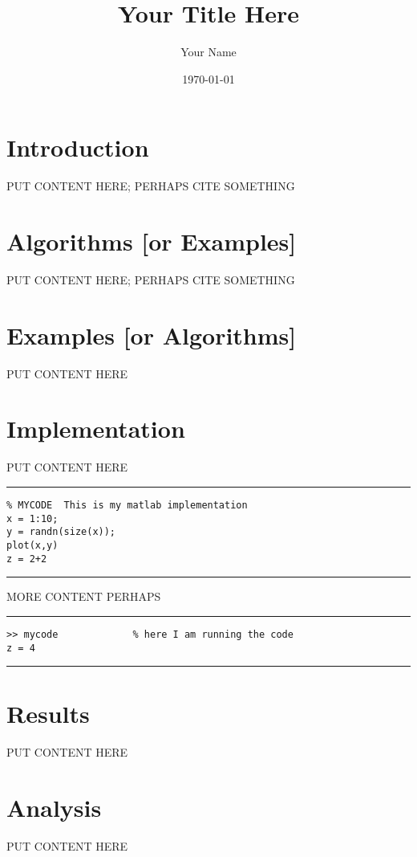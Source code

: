 \documentclass[12pt]{amsart}
\begin{document}
\title{Your Title Here}

\author{Your Name}

\date{\today}

\maketitle

\section{Introduction}  PUT CONTENT HERE; PERHAPS CITE SOMETHING \cite{einstein}


\section{Algorithms [or Examples]}  PUT CONTENT HERE; PERHAPS CITE SOMETHING \cite{nocedalwright}

\section{Examples [or Algorithms]}  PUT CONTENT HERE

\section{Implementation}  PUT CONTENT HERE

\bigskip
\hrule
\begin{verbatim}
% MYCODE  This is my matlab implementation
x = 1:10;
y = randn(size(x));
plot(x,y)
z = 2+2
\end{verbatim}
\hrule
\bigskip

MORE CONTENT PERHAPS

\bigskip
\hrule
\begin{verbatim}
>> mycode             % here I am running the code
z = 4
\end{verbatim}
\hrule

\section{Results}  PUT CONTENT HERE

\section{Analysis}  PUT CONTENT HERE
\end{document}
